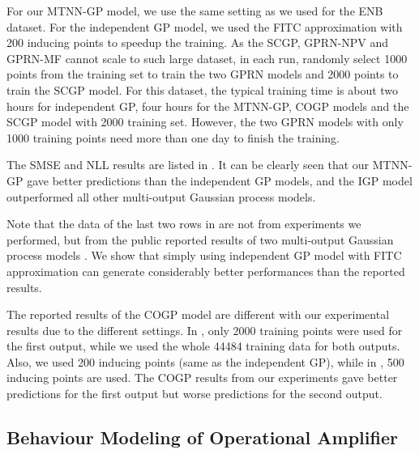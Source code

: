For our MTNN-GP model, we use the same setting as we used for the ENB dataset. For the independent GP model, we used the FITC approximation with 200 inducing points to speedup the training. As the SCGP, GPRN-NPV and GPRN-MF cannot scale to such large dataset, in each run, randomly select 1000 points from the training set to train the two GPRN models and 2000 points to train the SCGP model. For this dataset, the typical training time is about two hours for independent GP, four hours for the MTNN-GP, COGP models and the SCGP model with 2000 training set. However, the two GPRN models with only 1000 training points need more than one day to finish the training. 

The SMSE and NLL results are listed in . It can be clearly seen that our MTNN-GP gave better predictions than the independent GP models, and the IGP model outperformed all other multi-output Gaussian process models. 

Note that the data of the last two rows in  are not from experiments we performed, but from the public reported results of two multi-output Gaussian process models \cite{nguyen2014collaborative, NIPS2015_5665}. We show that simply using independent GP model with FITC approximation can generate considerably better performances than the reported results.

The reported results of the COGP model are different with our experimental results due to the different settings. In \cite{nguyen2014collaborative}, only 2000 training points were used for the first output, while we used the whole 44484 training data for both outputs. Also, we used 200 inducing points (same as the independent GP), while in \cite{nguyen2014collaborative}, 500 inducing points are used. The COGP results from our experiments gave better predictions for the first output but worse predictions for the second output.


\subsection{Behaviour Modeling of Operational Amplifier}\label{sec:dac14}


